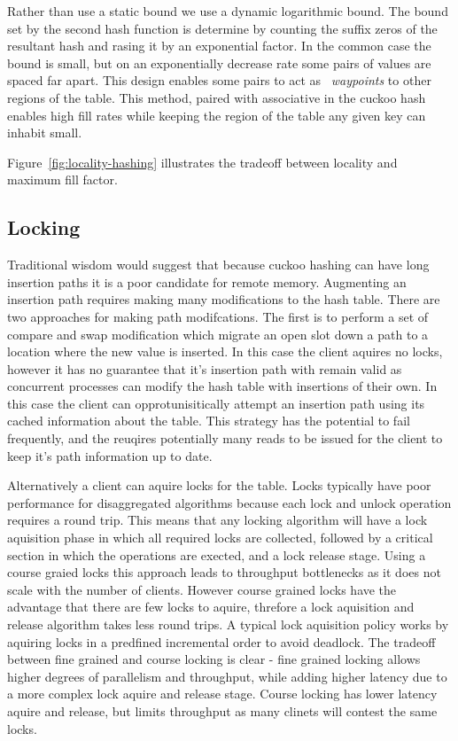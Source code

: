 Rather than use a static bound we use a dynamic logarithmic
bound. The bound set by the second hash function is
determine by counting the suffix zeros of the resultant hash
and rasing it by an exponential factor. In the common case
the bound is small, but on an exponentially decrease rate
some pairs of values are spaced far apart. This design
enables some pairs to act as ~\textit{waypoints} to other
regions of the table. This method, paired with associative
in the cuckoo hash enables high fill rates while keeping the
region of the table any given key can inhabit
small.

Figure~\ref{fig:locality-hashing} illustrates the tradeoff
between locality and maximum fill factor. 

\subsection{Locking}

Traditional wisdom would suggest that because cuckoo hashing
can have long insertion paths it is a poor candidate for
remote memory. Augmenting an insertion path requires making
many modifications to the hash table.  There are two
approaches for making path modifcations. The first is to
perform a set of compare and swap modification which migrate
an open slot down a path to a location where the new value
is inserted. In this case the client aquires no locks,
however it has no guarantee that it's insertion path with
remain valid as concurrent processes can modify the hash
table with insertions of their own. In this case the client
can opprotunisitically attempt an insertion path using its
cached information about the table. This strategy has the
potential to fail frequently, and the reuqires potentially
many reads to be issued for the client to keep it's path
information up to date. ~

Alternatively a client can aquire locks for the table. Locks
typically have poor performance for disaggregated algorithms
because each lock and unlock operation requires a round
trip. This means that any locking algorithm will have a lock
aquisition phase in which all required locks are collected,
followed by a critical section in which the operations are
exected, and a lock release stage. Using a course graied
locks this approach leads to throughput bottlenecks as it
does not scale with the number of clients. However course
grained locks have the advantage that there are few locks to
aquire, threfore a lock aquisition and release algorithm
takes less round trips. A typical lock aquisition policy
works by aquiring locks in a predfined incremental order to
avoid deadlock. The tradeoff between fine grained and course
locking is clear - fine grained locking allows higher
degrees of parallelism and throughput, while adding higher
latency due to a more complex lock aquire and release stage.
Course locking has lower latency aquire and release, but
limits throughput as many clinets will contest the same
locks.


